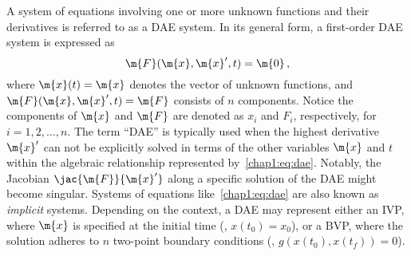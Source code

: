 A system of equations involving one or more unknown functions and their derivatives is referred to as a \ac{DAE} system. In its general form, a first-order \ac{DAE} system is expressed as
%
\begin{equation}
  \m{F}(\m{x}, \m{x}^{\prime}, t) = \m{0} \, \text{,}
  \label{chap1:eq:dae}
\end{equation}
%
where $\m{x}(t) = \m{x}$ denotes the vector of unknown functions, and $\m{F}(\m{x}, \m{x}^{\prime}, t) = \m{F}$ consists of $n$ components. Notice the components of $\m{x}$ and $\m{F}$ are denoted as $x_i$ and $F_i$, respectively, for $i = 1, 2, \dots, n$. The term ``\ac{DAE}'' is typically used when the highest derivative $\m{x}^{\prime}$ can not be explicitly solved in terms of the other variables $\m{x}$ and $t$ within the algebraic relationship represented by~\eqref{chap1:eq:dae}. Notably, the Jacobian $\jac{\m{F}}{\m{x}^{\prime}}$ along a specific solution of the \ac{DAE} might become singular. Systems of equations like~\eqref{chap1:eq:dae} are also known as \emph{implicit} systems. Depending on the context, a \ac{DAE} may represent either an \ac{IVP}, where $\m{x}$ is specified at the initial time (\eg{}, $x(t_0) = x_0$), or a \ac{BVP}, where the solution adheres to $n$ two-point boundary conditions (\eg{}, $g(x(t_0), x(t_f)) = 0$).

